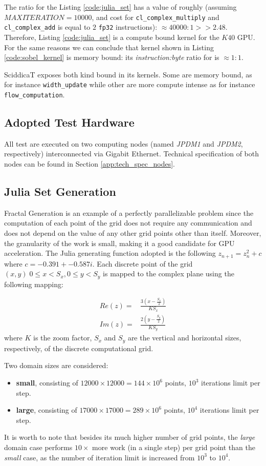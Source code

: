 The ratio for the Listing \ref{code:julia_set} has a value of roughly (assuming $MAXITERATION=10000$, and cost for \texttt{cl\_complex\_multiply} and \texttt{cl\_complex\_add} is equal to $2$ \texttt{fp32} instructions): $\approx 40000:1 >> 2.48$. Therefore, Listing \ref{code:julia_set} is a compute bound kernel for the $K40$ GPU.
For the same reasons we can conclude that kernel shown in Listing  \ref{code:sobel_kernel} is memory bound: its \textit{instruction:byte} ratio for is $\approx 1:1$.

SciddicaT  exposes both kind bound in its kernels. Some are memory bound, as for instance \texttt{width_update} while other are more compute intense as for instance \texttt{flow_computation}. 

\subsection{Adopted Test Hardware}
All test are executed on two computing nodes (named \textit{JPDM1} and \textit{JPDM2}, respectively) interconnected via Gigabit Ethernet.
Technical specification of both nodes can be found in Section \ref{app:tech_spec_nodes}.


\subsection{Julia Set Generation} \label{subsec:julia_performance}
Fractal Generation is an example of a perfectly parallelizable problem since the computation of each point of the grid does not require any communication and does not depend on the value of any other grid points other than itself. Moreover, the granularity of the work is small, making it a good candidate for GPU acceleration.
The Julia generating function adopted is the following $z_{n+1} = z^2_n + c$ where $c=-0.391+-0.587i$. Each discrete point of the grid $(x,y)\; 0\leq x < S_x, 0\leq y < S_y$ is mapped to the complex plane using the following mapping:

\begin{align*}
    Re(z)=&\frac{3(x-\frac{S_x}{2})}{K S_x} \\
    Im(z)=&\frac{2(y-\frac{S_y}{2})}{K S_y}
\end{align*}
where $K$ is the zoom factor, $S_x$ and $S_y$ are the vertical and horizontal sizes, respectively, of the discrete computational grid.

Two domain sizes are considered:
    \begin{itemize}
        \item \textbf{small}, consisting of  $12000 \times 12000 = 144 \times 10^6$ points, $10^3$ iterations limit per step.
        \item \textbf{large}, consisting of $17000 \times 17000 = 289 \times 10^6$ points, $10^4$ iterations limit per step.
    \end{itemize}
It is worth to note that besides its much higher number of grid points, the \textit{large} domain case performs $10 \times$ more work (in a single step) per grid point than the \textit{small} case, as the number of iteration limit is increased from $10^3$ to $10^4$.

